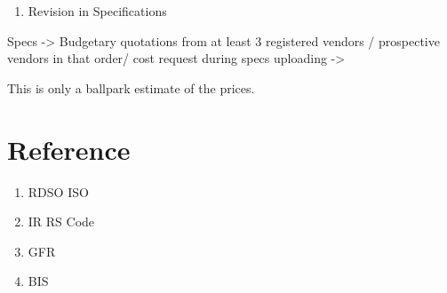 \documentclass[
  11pt,
  twoside]{article}
\providecommand{\tightlist}{%
  \setlength{\itemsep}{0pt}\setlength{\parskip}{0pt}}
\begin{document}
\begin{enumerate}
\def\labelenumi{\arabic{enumi}.}
\setcounter{enumi}{1}
\tightlist
\item
  Revision in Specifications
\end{enumerate}

Specs -\textgreater{} Budgetary quotations from at least 3 registered vendors / prospective vendors in that order/ cost request during specs uploading -\textgreater{}

This is only a ballpark estimate of the prices.

\hypertarget{reference}{%
\section{Reference}\label{reference}}

\begin{enumerate}
\def\labelenumi{\arabic{enumi}.}
\tightlist
\item
  RDSO ISO
\item
  IR RS Code
\item
  GFR
\item
  BIS
\end{enumerate}
\end{document}
